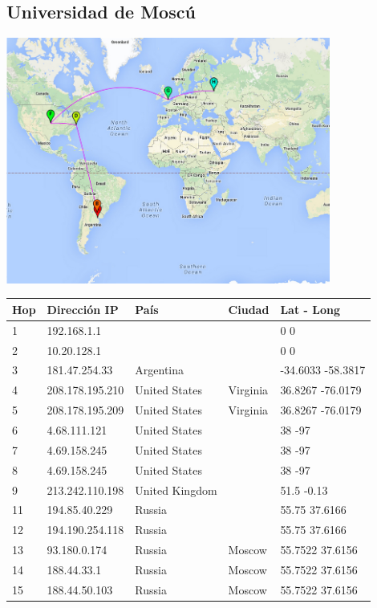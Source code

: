 \subsection{Universidad de Moscú}
\centerline{\includegraphics[width=0.8\textwidth]{mapas/rusia.png}}

\begin{center}
 \begin{tabular}{|l|l|l|l|l|}
    \hline
    Hop &Dirección IP &País &Ciudad &Lat - Long \\ \hline \hline
    1 & 192.168.1.1 &  &  & 0 0 \\ \hline
    2 & 10.20.128.1 &  &  & 0 0 \\ \hline
    3 & 181.47.254.33 & Argentina &  & -34.6033 -58.3817 \\ \hline
    4 & 208.178.195.210 & United States & Virginia & 36.8267 -76.0179 \\ \hline
    5 & 208.178.195.209 & United States & Virginia & 36.8267 -76.0179 \\ \hline
    6 & 4.68.111.121 & United States &  & 38 -97 \\ \hline
    7 & 4.69.158.245 & United States &  & 38 -97 \\ \hline
    8 & 4.69.158.245 & United States &  & 38 -97 \\ \hline
    9 & 213.242.110.198 & United Kingdom &  & 51.5 -0.13 \\ \hline
    11 & 194.85.40.229 & Russia &  & 55.75 37.6166 \\ \hline
    12 & 194.190.254.118 & Russia &  & 55.75 37.6166 \\ \hline
    13 & 93.180.0.174 & Russia & Moscow & 55.7522 37.6156 \\ \hline
    14 & 188.44.33.1 & Russia & Moscow & 55.7522 37.6156 \\ \hline
    15 & 188.44.50.103 & Russia & Moscow & 55.7522 37.6156 \\ \hline
 \end{tabular}
\end{center}

